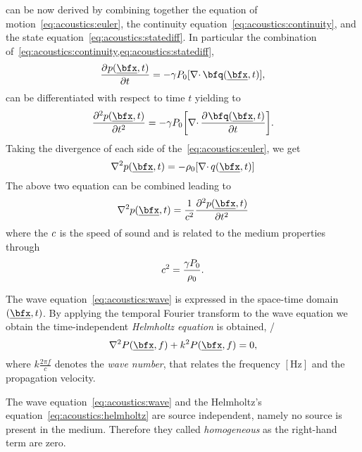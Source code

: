  can be now derived by combining together
the equation of motion~\ref{eq:acoustics:euler},
the continuity equation~\ref{eq:acoustics:continuity},
and the state equation~\ref{eq:acoustics:statediff}.
In particular the combination of~\cref{eq:acoustics:continuity,eq:acoustics:statediff},
\begin{equation}
    \kpderiv[]{\pressureSpaceTime}{t} = - \gamma P_0 \kbracket{\divergence{\bfq\depSpaceTime}}
    ,
\end{equation}
can be differentiated with respect to time $t$ yielding to
\begin{equation}
    \kpderiv[2]{\pressureSpaceTime}{t} = - \gamma P_0 \kbracket{\divergence{\kpderiv[]{\bfq\depSpaceTime}{t}}}
    .
\end{equation}
Taking the divergence of each side of the~\cref{eq:acoustics:euler}, we get
\begin{equation}
    \knabla^2 \pressureSpaceTime = -\densityEq \kbracket{\divergence{q\depSpaceTime}}
\end{equation}
The above two equation can be combined leading to
\begin{equation}
    \knabla^2 \pressureSpaceTime = \frac{1}{\speedOfSound^2} \kpderiv[2]{\pressureSpaceTime}{t}
\end{equation}
where the $c$ is the speed of sound and is related to the medium properties through
\begin{equation}
    c^2 = \frac{\gamma P_0}{\rho_0}
    .
\end{equation}


The wave equation~\ref{eq:acoustics:wave} is expressed in the space-time domain $\depSpaceTime$.
By applying the temporal Fourier transform to the wave equation we obtain the time-independent \textit{Helmholtz equation} is obtained, \ie/
\begin{equation}
    \label{eq:acoustics:helmholtz}
    \knabla^2 P(\positionMicrophone, f) + k^2 P(\positionMicrophone, f) = 0
    ,
\end{equation}
where $k \frac{2 \pi f}{c}$ denotes the \textit{wave number}, that relates the frequency $[\si{\hertz}]$ and the propagation velocity.

The wave equation~\ref{eq:acoustics:wave} and the Helmholtz's equation~\ref{eq:acoustics:helmholtz} are source independent,
namely no source is present in the medium. Therefore they called \textit{homogeneous} as the right-hand term are zero.

